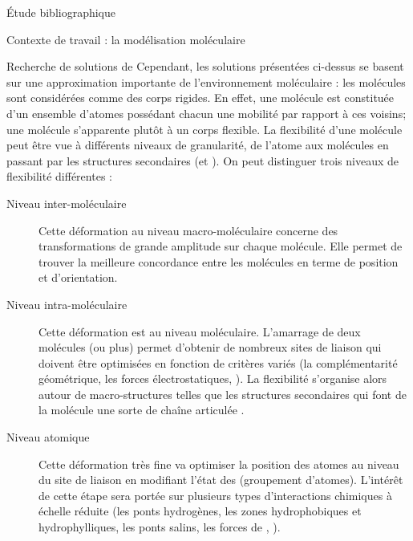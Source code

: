 \documentclass[myfrancais,ngerman,english,french]{mythesis}
\begin{document}
\begin{mychapter}{Étude bibliographique}
\begin{mysection}{Contexte de travail : la modélisation moléculaire}
\begin{mysubsection}{Recherche de solutions de }
				Cependant, les solutions présentées ci-dessus se basent sur une approximation importante de l'environnement moléculaire : les molécules sont considérées comme des corps rigides.
				En effet, une molécule est constituée d'un ensemble d'atomes possédant chacun une mobilité par rapport à ces voisins; une molécule s'apparente plutôt à un corps flexible.
				La flexibilité d'une molécule peut être vue à différents niveaux de granularité, de l'atome aux molécules en passant par les structures secondaires (\myhelice* et \myfeuillet*).
				On peut distinguer trois niveaux de flexibilité différentes :
				\begin{description}
					\item[Niveau inter-moléculaire] Cette déformation au niveau macro-moléculaire concerne des transformations de grande amplitude sur chaque molécule.
						Elle permet de trouver la meilleure concordance entre les molécules en terme de position et d'orientation.
					\item[Niveau intra-moléculaire] Cette déformation est au niveau moléculaire.
						L'amarrage de deux molécules (ou plus) permet d'obtenir de nombreux sites de liaison qui doivent être optimisées en fonction de critères variés (la complémentarité géométrique, les forces électrostatiques, \myetc).
						La flexibilité s'organise alors autour de macro-structures telles que les structures secondaires qui font de la molécule une sorte de chaîne articulée .
					\item[Niveau atomique] Cette déformation très fine va optimiser la position des atomes au niveau du site de liaison en modifiant l'état des  (groupement d'atomes).
						L'intérêt de cette étape sera portée sur plusieurs types d'interactions chimiques à échelle réduite (les ponts hydrogènes, les zones hydrophobiques et hydrophylliques, les ponts salins, les forces de  , \myetc).
				\end{description}

				\begin{myfigure}
				\end{myfigure}


\end{mysubsection}
\end{mysection}
\end{mychapter}
\end{document}

